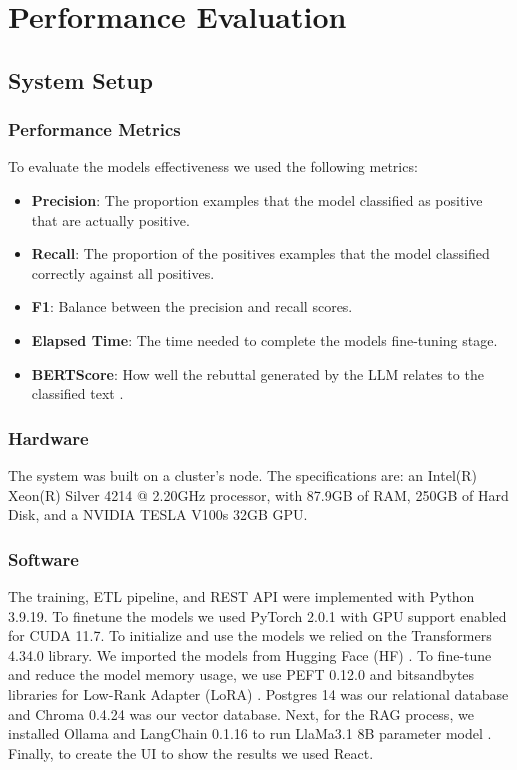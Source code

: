 \section{Performance Evaluation}
\subsection{System Setup}
\subsubsection{Performance Metrics}
To evaluate the models effectiveness we used the following metrics:

\begin{itemize}
	\item{\textbf{Precision}}:  The proportion  examples that the model classified as positive that are actually positive. 
	\item{\textbf{Recall}}:  The proportion of the positives examples that the model classified correctly against all positives.
	\item{\textbf{F1}}: Balance between the precision and recall scores.
	\item{\textbf{Elapsed Time}}: The time needed to complete the models fine-tuning stage.
	\item{\textbf{BERTScore}}: How well the rebuttal generated by the LLM relates to the classified text \cite{zhang2020bertscoreevaluatingtextgeneration}.
\end{itemize}

\subsubsection{Hardware}
The system was built on a cluster's node. The specifications are: an Intel(R) Xeon(R) Silver 4214 @ 2.20GHz processor, with 87.9GB of RAM, 250GB of Hard Disk, and a NVIDIA TESLA V100s 32GB GPU.

\subsubsection{Software}
The training, ETL pipeline, and REST API were implemented with Python 3.9.19. To finetune the models we used PyTorch 2.0.1 with GPU support enabled for
CUDA 11.7. To initialize and use the models we relied on  the Transformers 4.34.0 library. We imported the models from Hugging Face (HF) \cite{huggingface}. To fine-tune and reduce the model memory usage, we use PEFT 0.12.0 and bitsandbytes libraries for Low-Rank Adapter (LoRA) \cite{hu2021loralowrankadaptationlarge}. Postgres 14 was our relational database and Chroma 0.4.24 was our vector database. Next, for the RAG process, we installed Ollama \cite{ollama} and LangChain 0.1.16 to run LlaMa3.1 8B parameter model \cite{touvron2023llamaopenefficientfoundation}. Finally, to create the UI to show the results we used React.

